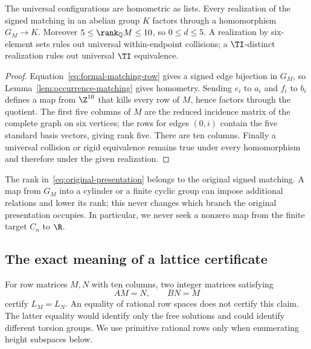 \begin{lemma}\label{lem:universal-property}
The universal configurations are homometric as lists. Every realization
of the signed matching in an abelian group $K$ factors through a
homomorphism $G_M\to K$. Moreover $5\le\rank_{\mathbb Q}M\le10$, so
$0\le d\le5$. A realization by six-element sets rules out universal
within-endpoint collisions; a $\TI$-distinct realization rules out
universal $\TI$ equivalence.
\end{lemma}
\begin{proof}
Equation~\eqref{eq:formal-matching-row} gives a signed edge bijection in
$G_M$, so Lemma~\ref{lem:occurrence-matching} gives homometry. Sending
$e_i$ to $a_i$ and $f_i$ to $b_i$ defines a map from $\Z^{10}$ that kills
every row of $M$, hence factors through the quotient. The first five
columns of $M$ are the reduced incidence matrix of the complete graph
on six vertices; the rows for edges $(0,i)$ contain the five standard
basis vectors, giving rank five. There are ten columns. Finally a
universal collision or rigid equivalence remains true under every
homomorphism and therefore under the given realization.
\end{proof}

The rank in~\eqref{eq:original-presentation} belongs to the original
signed matching. A map from $G_M$ into a cylinder or a finite cyclic group
can impose additional relations and lower its rank; this never changes
which branch the original presentation occupies. In particular, we never
seek a nonzero map from the finite target $C_n$ to $\R$.

\subsection{The exact meaning of a lattice certificate}
For row matrices $M,N$ with ten columns, two integer matrices satisfying
\begin{equation}\label{eq:two-way-lattice-cert}
 AM=N,\qquad BN=M
\end{equation}
certify $L_M=L_N$. An equality of rational row spaces does not certify this
claim. The latter equality would identify only the free solutions and
could identify different torsion groups. We use primitive rational rows
only when enumerating height subspaces below.

